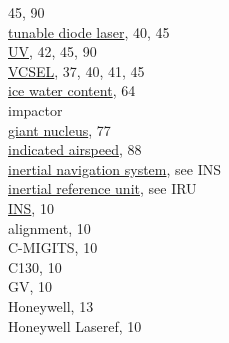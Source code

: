 \documentclass[
]{article}
\begin{document}
45, 90\\
\hspace*{0.333em}\hspace*{0.333em}\href{./4-the-state-of-the-atmosphere.html\#MR}{tunable
diode laser}, 40, 45\\
\hspace*{0.333em}\hspace*{0.333em}\href{./4-the-state-of-the-atmosphere.html\#uvh-n}{UV},
42, 45, 90\\
\hspace*{0.333em}\hspace*{0.333em}\href{./4-the-state-of-the-atmosphere.html\#vcsel-dp}{VCSEL},
37, 40, 41, 45\\
\href{./5-cloud-physics-variables.html\#PSD-LWC}{ice water content},
64\\
impactor\\
\hspace*{0.333em}\hspace*{0.333em}\href{./7-aerosol-particle-measurements.html\#special-aerosol}{giant
nucleus}, 77\\
\href{./10-obsolete-variables\#ias}{indicated airspeed}, 88\\
\href{./3-the-state-of-the-aircraft.html\#inertial-reference-systems}{inertial
navigation system}, see INS\\
\href{./10-obsolete-variables.html\#mdy}{inertial reference unit}, see
IRU\\
\href{./3-the-state-of-the-aircraft.html\#inertial-reference-systems}{INS},
10\\
\hspace*{0.333em}\hspace*{0.333em}alignment, 10\\
\hspace*{0.333em}\hspace*{0.333em}C-MIGITS, 10\\
\hspace*{0.333em}\hspace*{0.333em}C130, 10\\
\hspace*{0.333em}\hspace*{0.333em}GV, 10\\
\hspace*{0.333em}\hspace*{0.333em}Honeywell, 13\\
\hspace*{0.333em}\hspace*{0.333em}Honeywell Laseref, 10\\
\end{document}
